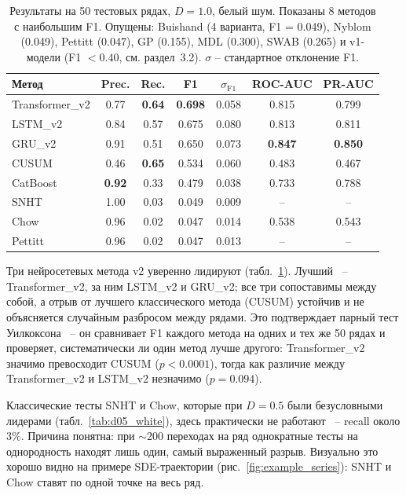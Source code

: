 \documentclass[12pt,a4paper]{article}
\begin{document}
\begin{table}[ht]
\centering
\caption{Результаты на 50 тестовых рядах, $D = 1.0$, белый шум. Показаны 8 методов с наибольшим F1. Опущены: Buishand (4 варианта, F1 = 0.049), Nyblom (0.049), Pettitt (0.047), GP (0.155), MDL (0.300), SWAB (0.265) и v1-модели (F1 $< 0.40$, см. раздел~3.2). $\sigma$  -- стандартное отклонение F1.}
\label{tab:d10_white}
\begin{tabular}{lcccccc}
\hline
\textbf{Метод} & \textbf{Prec.} & \textbf{Rec.} & \textbf{F1} & $\sigma_{\text{F1}}$ & \textbf{ROC-AUC} & \textbf{PR-AUC} \\
\hline
Transformer\_v2  & 0.77 & \textbf{0.64} & \textbf{0.698} & 0.058 & 0.815 & 0.799 \\
LSTM\_v2         & 0.84 & 0.57 & 0.675 & 0.080 & 0.813 & 0.811 \\
GRU\_v2          & 0.91 & 0.51 & 0.650 & 0.073 & \textbf{0.847} & \textbf{0.850} \\
CUSUM            & 0.46 & \textbf{0.65} & 0.534 & 0.060 & 0.483 & 0.467 \\
CatBoost         & \textbf{0.92} & 0.33 & 0.479 & 0.038 & 0.733 & 0.788 \\
SNHT             & 1.00 & 0.03 & 0.049 & 0.009 &  -- &  -- \\
Chow             & 0.96 & 0.02 & 0.047 & 0.014 & 0.538 & 0.543 \\
Pettitt          & 0.96 & 0.02 & 0.047 & 0.013 &  -- &  -- \\
\hline
\end{tabular}
\end{table}

Три нейросетевых метода v2 уверенно лидируют 
(табл.~\ref{tab:d10_white}). Лучший~ -- Transformer\_v2, 
за ним LSTM\_v2 и GRU\_v2; все три сопоставимы между собой, 
а отрыв от лучшего классического метода (CUSUM) 
устойчив и не объясняется случайным разбросом между рядами. 
Это подтверждает парный тест Уилкоксона~ -- он сравнивает 
F1 каждого метода на одних и тех же 50 рядах и проверяет, 
систематически ли один метод лучше другого: Transformer\_v2 
значимо превосходит CUSUM ($p < 0.0001$), тогда как 
различие между Transformer\_v2 и LSTM\_v2 незначимо 
($p = 0.094$).

Классические тесты SNHT и Chow, которые при $D = 0.5$ были безусловными лидерами (табл.~\ref{tab:d05_white}), здесь практически не работают~ -- recall около 3\%. Причина понятна: при $\sim$200 переходах на ряд однократные тесты на однородность находят лишь один, самый выраженный разрыв. Визуально это хорошо видно на примере SDE-траектории (рис.~\ref{fig:example_series}): SNHT и Chow ставят по одной точке на весь ряд.
\end{document}

